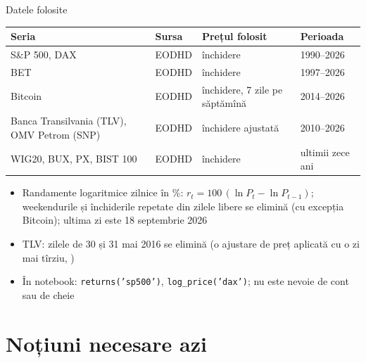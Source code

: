 \begin{frame}{Datele folosite}
\itemsize{\small}
\begin{center}
\footnotesize
\begin{tabular}{llll}
\toprule
\textbf{Seria} & \textbf{Sursa} & \textbf{Prețul folosit} & \textbf{Perioada} \\
\midrule
S\&P 500, DAX & EODHD & închidere & 1990--2026 \\
BET & EODHD & închidere & 1997--2026 \\
Bitcoin & EODHD & închidere, 7 zile pe săptămînă & 2014--2026 \\
Banca Transilvania (TLV), OMV Petrom (SNP) & EODHD & închidere ajustată & 2010--2026 \\
WIG20, BUX, PX, BIST 100 & EODHD & închidere & ultimii zece ani \\
\bottomrule
\end{tabular}
\end{center}
\begin{itemize}
    \item Randamente logaritmice zilnice în \%: $r_t = 100\,(\ln P_t - \ln P_{t-1})$; weekendurile și închiderile repetate din zilele libere se elimină (cu excepția Bitcoin); ultima zi este 18 septembrie 2026
    \item TLV: zilele de 30 și 31 mai 2016 se elimină (o ajustare de preț aplicată cu o zi mai tîrziu, )
    \item În notebook: \texttt{returns('sp500')}, \texttt{log\_price('dax')}; nu este nevoie de cont sau de cheie
\end{itemize}
\end{frame}


\section{Noțiuni necesare azi}

